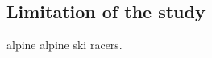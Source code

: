 \documentclass{article}
\begin{document}
\subsection{Limitation of the study}





































































































alpine alpine ski racers.
\end{document}
